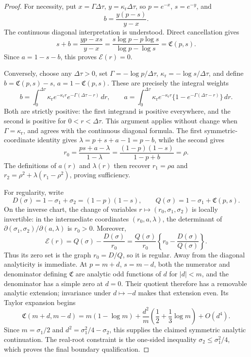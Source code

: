\begin{proof}
For necessity, put \(x=\Gamma\Delta\tau\), \(y=\kappa_{\mathrm r}\Delta\tau\),
so \(p=e^{-x}\), \(s=e^{-y}\), and
\[
b=\frac{y(p-s)}{y-x}.
\]
The continuous diagonal interpretation is understood.  Direct cancellation
gives
\[
s+b=\frac{yp-xs}{y-x}
=\frac{s\log p-p\log s}{\log p-\log s}=\mathfrak C(p,s).
\]
Since \(a=1-s-b\), this proves \(\mathcal E(r)=0\).

Conversely, choose any \(\Delta\tau>0\), set
\(\Gamma=-\log p/\Delta\tau\),
\(\kappa_{\mathrm r}=-\log s/\Delta\tau\), and define
\(b=\mathfrak C(p,s)-s\), \(a=1-\mathfrak C(p,s)\).  These are precisely the
integral weights
\[
b=\int_0^{\Delta\tau}\kappa_{\mathrm r}e^{-\kappa_{\mathrm r}r}
e^{-\Gamma(\Delta\tau-r)}\,dr,
\qquad
a=\int_0^{\Delta\tau}\kappa_{\mathrm r}e^{-\kappa_{\mathrm r}r}
\{1-e^{-\Gamma(\Delta\tau-r)}\}\,dr.
\]
Both are strictly positive: the first integrand is positive everywhere, and
the second is positive for \(0<r<\Delta\tau\).  This argument applies without
change when \(\Gamma=\kappa_{\mathrm r}\), and agrees with the continuous
diagonal formula.  The first
symmetric-coordinate identity gives
\(\lambda=p+s+a-1=p-b\), while the second gives
\[
r_0=\frac{ps+a-\lambda}{1-\lambda}
=\frac{(1-p)(1-s)}{1-p+b}=\rho.
\]
The definitions of \(a(r)\) and \(\lambda(r)\) then recover \(r_1=\rho a\)
and \(r_2=\rho^2+\lambda(r_1-\rho^2)\), proving sufficiency.

For regularity, write
\[
D(\sigma)=1-\sigma_1+\sigma_2=(1-p)(1-s),\qquad
Q(\sigma)=1-\sigma_1+\mathfrak C(p,s).
\]
On the inverse chart, the change of variables
\(r\mapsto(r_0,\sigma_1,\sigma_2)\) is locally invertible: in the intermediate
coordinates \((r_0,a,\lambda)\), the determinant of
\(\partial(\sigma_1,\sigma_2)/\partial(a,\lambda)\) is \(r_0>0\).  Moreover,
\[
\mathcal E(r)=Q(\sigma)-\frac{D(\sigma)}{r_0}
=\frac{Q(\sigma)}{r_0}
\left\{r_0-\frac{D(\sigma)}{Q(\sigma)}\right\}.
\]
Thus its zero set is the graph \(r_0=D/Q\), so it is regular.  Away from the
diagonal analyticity is immediate.  At \(p=m+d\), \(s=m-d\), both the
numerator and denominator defining \(\mathfrak C\) are analytic odd functions
of \(d\) for \(|d|<m\), and the denominator has a simple zero at \(d=0\).
Their quotient therefore has a removable analytic extension; invariance under
\(d\mapsto-d\) makes that extension even.  Its Taylor expansion begins
\[
\mathfrak C(m+d,m-d)=m(1-\log m)
+\frac{d^2}{m}\left(\frac12+\frac13\log m\right)+O(d^4).
\]
Since \(m=\sigma_1/2\) and \(d^2=\sigma_1^2/4-\sigma_2\), this supplies the
claimed symmetric analytic continuation.  The real-root constraint is the
one-sided inequality \(\sigma_2\le\sigma_1^2/4\), which proves the final
boundary qualification.
\end{proof}

